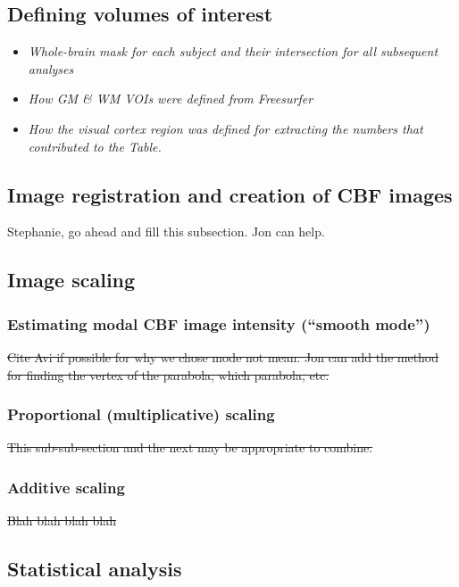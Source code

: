 \subsection{Defining volumes of interest}
\begin{itemize}
\item \textit{Whole-brain mask for each subject and their intersection for all subsequent analyses}
\item \textit{How GM & WM VOIs were defined from Freesurfer}
\item \textit{How the visual cortex region was defined for extracting the numbers that contributed to the Table.}
\end{itemize}

\subsection{Image registration and creation of CBF images}
Stephanie, go ahead and fill this subsection. Jon can help.

\subsection{Image scaling}
\subsubsection{Estimating modal CBF image intensity (``smooth mode'')}
\sout{Cite Avi if possible for why we chose mode not mean. Jon can add the method for finding the vertex of the parabola, which parabola, etc.} 
\subsubsection{Proportional (multiplicative) scaling}
\sout{This sub-sub-section and the next may be appropriate to combine.}
\subsubsection{Additive scaling}
\sout{Blah blah blah blah}

\subsection{Statistical analysis}



